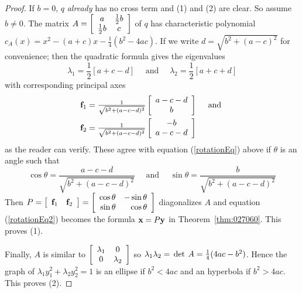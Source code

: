 \begin{proof}
If $b = 0$, $q$ \textit{already} has no cross term and (1) and (2) are clear. So assume $b \neq 0$.
The matrix $A = \left[ \begin{array}{cc}
a & \tfrac{1}{2}b \\
\tfrac{1}{2}b & c
\end{array}\right]$ of $q$ has characteristic polynomial $c_A(x) = x^2 - (a + c)x - \frac{1}{4}(b^2 - 4ac)$. If we write $d = \sqrt{b^2 + (a - c)^2}$ for convenience; then the quadratic formula gives the eigenvalues
\begin{equation*}
\lambda_{1} = \frac{1}{2}[a + c - d] \quad \mbox{ and } \quad \lambda_{2} = \frac{1}{2}[a + c + d]
\end{equation*}
with corresponding principal axes
\begin{align*}
\textbf{f}_{1} &= \tfrac{1}{\sqrt{b^2 + (a - c - d)^2}}\left[ \begin{array}{c}
	a - c - d \\
	b
\end{array}\right] \quad \mbox{ and } \\
\textbf{f}_{2} &= \tfrac{1}{\sqrt{b^2 + (a - c - d)^2}}\left[ \begin{array}{c}
	-b \\
	a - c - d 
	\end{array}\right]
\end{align*}
as the reader can verify. These agree with equation (\ref{rotationEq}) above if $\theta$ is an angle such that
\begin{equation*}
\cos\theta = \frac{a - c - d}{\sqrt{b^2 + (a - c - d)^2}} \quad \mbox{ and } \quad \sin\theta = \frac{b}{\sqrt{b^2 + (a - c - d)^2}}
\end{equation*}
Then $P = \left[ \begin{array}{cc}
\textbf{f}_{1} & \textbf{f}_{2}
\end{array}\right] = \left[ \begin{array}{rr}
\cos\theta & -\sin\theta \\
\sin\theta & \cos\theta
\end{array}\right]$ diagonalizes $A$ and equation (\ref{rotationEq2}) becomes the formula $\textbf{x} = P\textbf{y}$ in Theorem~\ref{thm:027060}. This proves (1).


Finally, $A$ is similar to $\left[ \begin{array}{cc}
\lambda_{1} & 0 \\
0 & \lambda_{2}
\end{array}\right]$
 so $\lambda_{1}\lambda_{2} = \thinspace\operatorname{det\medspace}A = \tfrac{1}{4}(4ac - b^2)$. Hence the graph of $\lambda_{1}y_{1}^2 + \lambda_{2}y_{2}^2 = 1$ is an ellipse if $b^{2} < 4ac$ and an hyperbola if $b^{2} > 4ac$. This proves (2).
\end{proof}


